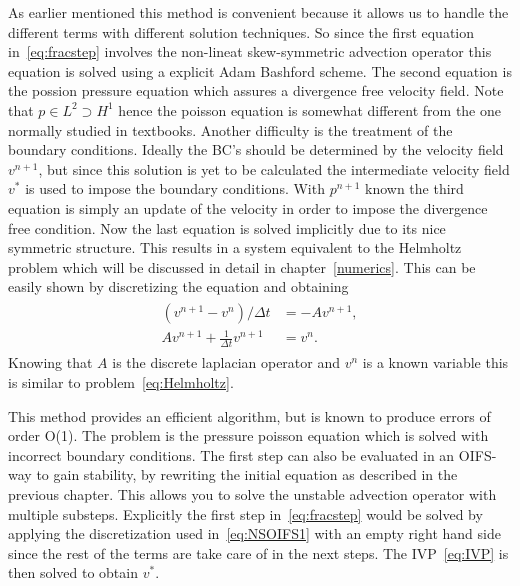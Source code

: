 As earlier mentioned this method is convenient because it allows us to handle the different 
terms with different solution techniques. So since the first equation in~\ref{eq:fracstep}
involves the non-lineat skew-symmetric advection operator this equation is solved using a 
explicit Adam Bashford scheme. The second equation is the possion pressure equation which
assures a divergence free velocity field. Note that $p\in L^2\supset H^1$ hence the poisson equation 
is somewhat different from the one normally studied in textbooks. Another difficulty is the 
treatment of the boundary conditions. Ideally the BC's should be determined by the velocity 
field $v^{n+1}$, but since this solution is yet to be calculated the intermediate velocity field 
$v^{*}$ is used to impose the boundary conditions. With $p^{n+1}$ known the third equation is 
simply an update of the velocity in order to impose the divergence free condition. Now the last
equation is solved implicitly due to its nice symmetric structure. This results in a system 
equivalent to the Helmholtz problem which will be discussed in detail in chapter~\ref{numerics}.
This can be easily shown by discretizing the equation and obtaining 
\begin{align}
    \begin{split}
    (v^{n+1}-v^{n})/\Delta t  &= -Av^{n+1},\\
    Av^{n+1}+\frac{1}{\Delta t} v^{n+1} &= v^{n}.
    \end{split}
    \label{eq:fracHelm}
\end{align}
Knowing that $A$ is the discrete laplacian operator and $v^n$ is a known variable this is 
similar to problem~\ref{eq:Helmholtz}.


This method provides an efficient algorithm, but is known to produce errors of order O(1).
The problem is the pressure poisson equation which is solved with incorrect boundary 
conditions. The first step can also be evaluated in an OIFS-way to gain stability,
by rewriting the initial equation as described in the previous chapter. This allows you 
to solve the unstable advection operator with multiple substeps. Explicitly the first step 
in~\ref{eq:fracstep} would be solved by applying the discretization used in~\ref{eq:NSOIFS1}
with an empty right hand side since the rest of the terms are take care of in the next steps. 
The IVP~\ref{eq:IVP} is then solved to obtain $v^{*}$.



